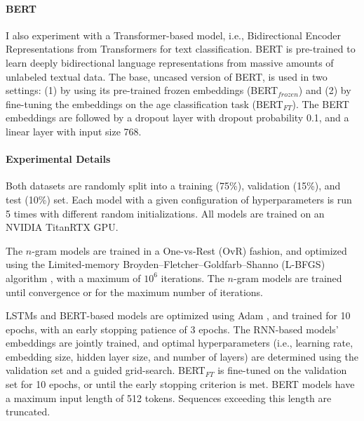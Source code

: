 \paragraph{BERT} 
I also experiment with a Transformer-based model, i.e., 
Bidirectional Encoder Representations from Transformers \cite[BERT;][]{devlin-etal-2019-bert} for text classification.
BERT is pre-trained to learn deeply bidirectional language representations from massive amounts of unlabeled textual data. 
The base, uncased version of BERT, is used in two settings: (1) by using its 
pre-trained frozen embeddings (BERT$_{frozen}$) and (2) by fine-tuning the embeddings on the age classification task (BERT$_{FT}$).
The BERT embeddings are followed by a dropout layer with dropout probability 0.1, and a linear layer with input size 768.

\paragraph{Experimental Details} %

Both datasets are randomly split into a training (75\%), validation (15\%), and test (10\%) set.
Each model with a given configuration of hyperparameters is run 5 times with different random initializations. All models are trained on an NVIDIA TitanRTX GPU.

The $n$-gram models are trained in a One-vs-Rest (OvR) fashion, and optimized using the Limited-memory Broyden–Fletcher–Goldfarb–Shanno (L-BFGS) algorithm \citep{liu1989limited}, with a maximum of $10^6$ iterations. The $n$-gram models are trained until convergence or for the maximum number of iterations.

LSTMs and BERT-based models
are optimized using Adam \citep{DBLP:journals/corr/KingmaB14}, and trained for 10 epochs, with an early stopping patience of 3 epochs.
The RNN-based models' embeddings are jointly trained, and optimal hyperparameters (i.e., learning rate, embedding size, hidden layer size, and number of layers)  are determined using the validation set and a guided grid-search. %
BERT$_{FT}$ is fine-tuned on the validation set for 10 epochs, or until the early stopping criterion is met.
BERT models have a maximum input length of 512 tokens. Sequences exceeding this length are truncated.